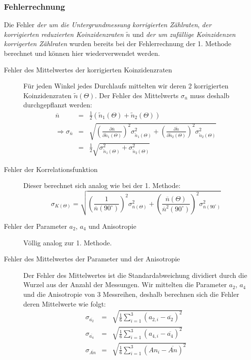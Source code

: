 \documentclass[a4paper,titlepage]{scrartcl}
\numberwithin{equation}{section}
\begin{document}
\subsubsection{Fehlerrechnung}
Die Fehler \emph{der um die Untergrundmessung korrigierten Zählraten}, \emph{der korrigierten reduzierten Koinzidenzraten $\tilde{n}$} und \emph{der um zufällige Koinzidenzen korrigerten Zählraten} wurden bereits bei der Fehlerrechnung der 1. Methode berechnet und können hier wiederverwendet werden.
\begin{description}
\item[Fehler des Mittelwertes der korrigierten Koinzidenzraten] Für jeden Winkel jedes Durchlaufs mittelten wir deren 2 korrigierten Koinzidenzraten $\tilde{n}(\Theta)$. Der Fehler des Mittelwerts $\sigma_{\overline{n}}$ muss deshalb durchgepflanzt werden:
\begin{eqnarray*}
\overline{n}&=&\frac{1}{2}(\tilde{n}_1(\Theta) + \tilde{n}_2(\Theta))\\
\Longrightarrow \sigma_{\overline{n}}&=&\sqrt{\left(\frac{\partial \overline{n}}{\partial \tilde{n}_1(\Theta)}\right)^2 \sigma^2_{\tilde{n}_1(\Theta)} + \left(\frac{\partial \tilde{n}}{\partial \tilde{n}_2(\Theta)}\right)^2 \sigma^2_{\tilde{n}_2(\Theta)}}\\
&=&\frac{1}{2} \sqrt{\sigma^2_{\tilde{n}_1(\Theta)} + \sigma^2_{\tilde{n}_2(\Theta)}}
\end{eqnarray*}
\item[Fehler der Korrelationsfunktion] Dieser berechnet sich analog wie bei der 1. Methode:
\begin{equation*}
\sigma_{K(\Theta)}=\sqrt{\left(\frac{1}{\overline{n}(90^{\circ})}\right)^2 \sigma^2_{\overline{n}(\Theta)} + \left(\frac{\overline{n}(\Theta)}{\overline{n}^2(90^{\circ})}\right)^2 \sigma^2_{\overline{n}(90^{\circ})}}
\end{equation*}
\item[Fehler der Parameter $a_2$, $a_4$ und Anisotropie] Völlig analog zur 1. Methode.
\item[Fehler des Mittelwertes der Parameter und der Anisotropie] Der Fehler des Mittelwertes ist die Standardabweichung dividiert durch die Wurzel aus der Anzahl der Messungen. Wir mittelten die Parameter $a_2$, $a_4$ und die Anisotropie von 3 Messreihen, deshalb berechnen sich die Fehler deren Mittelwerte wie folgt:
\begin{eqnarray*}
\sigma_{\overline{a_2}}&=&\sqrt{\frac{1}{6} \sum_{i=1}^3 (a_{2,i}-\overline{a_2})^2}\\
\sigma_{\overline{a_4}}&=&\sqrt{\frac{1}{6} \sum_{i=1}^3 (a_{4,i}-\overline{a_4})^2}\\
\sigma_{\overline{An}}&=&\sqrt{\frac{1}{6} \sum_{i=1}^3 (An_i-\overline{An})^2}
\end{eqnarray*}
\end{description}
\end{document}
